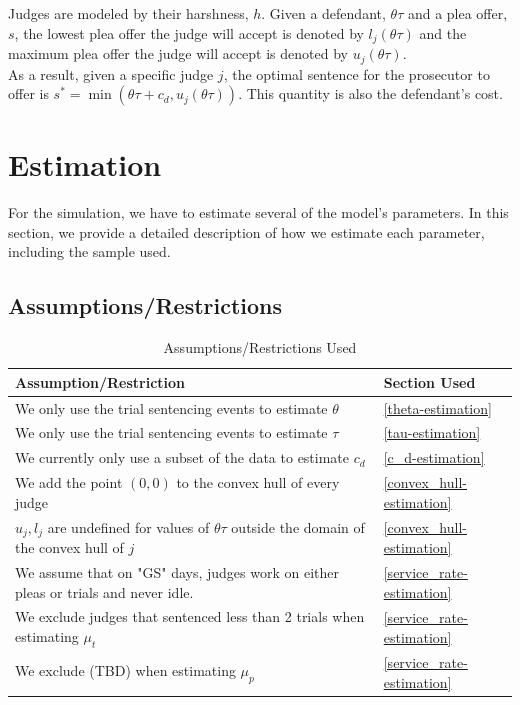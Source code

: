 \documentclass[11pt]{article}
\theoremstyle{ModifiedStyle}
\begin{document}
  Judges are modeled by their harshness, $h$. Given a defendant, $\theta \tau$ and a plea offer, $s$, the lowest plea offer the judge will accept is denoted by $l_j(\theta \tau)$ and the maximum plea offer the judge will accept is denoted by $u_j(\theta \tau)$.\\

  As a result, given a specific judge $j$, the optimal sentence for the prosecutor to offer is $s^* = \min(\theta \tau + c_d,u_j(\theta \tau))$. This quantity is also the defendant's cost.

\section{Estimation}
  For the simulation, we have to estimate several of the model's parameters. In this section, we provide a detailed description of how we estimate each parameter, including the sample used.

  \subsection{Assumptions/Restrictions}
    \begin{table}[H]
      \centering
      \caption{Assumptions/Restrictions Used}
      \label{tab:assumptions}
      \begin{tabular}{ll}
      \hline
      \textbf{Assumption/Restriction}                              & \textbf{Section Used}        \\ \hline
      We only use the trial sentencing events to estimate $\theta$ & \ref{theta-estimation}       \\
      We only use the trial sentencing events to estimate $\tau$   & \ref{tau-estimation}         \\
      We currently only use a subset of the data to estimate $c_d$ & \ref{c_d-estimation}         \\
      We add the point $(0,0)$ to the convex hull of every judge   & \ref{convex_hull-estimation} \\
      $u_j, l_j$ are undefined for values of $\theta \tau$ outside the domain of the convex hull of $j$         & \ref{convex_hull-estimation}  \\
      We assume that on "GS" days, judges work on either pleas or trials and never idle.                        & \ref{service_rate-estimation} \\
      We exclude judges that sentenced less than 2 trials when estimating $\mu_t$ & \ref{service_rate-estimation} \\
      We exclude (TBD) when estimating $\mu_p$ & \ref{service_rate-estimation}} \\ \hline
      \end{tabular}
    \end{table}
\end{document}
